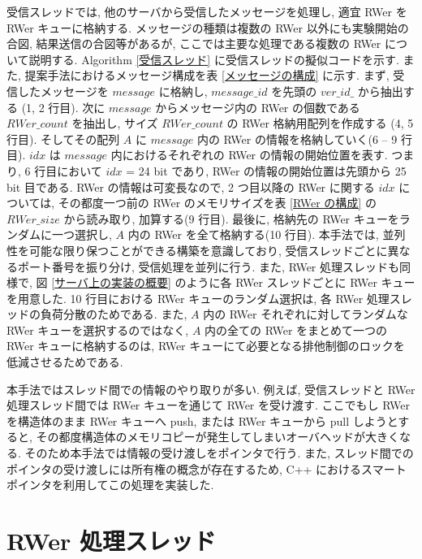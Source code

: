 受信スレッドでは, 他のサーバから受信したメッセージを処理し, 適宜 RWer を RWer キューに格納する. メッセージの種類は複数の RWer 以外にも実験開始の合図, 結果送信の合図等があるが, ここでは主要な処理である複数の RWer について説明する. Algorithm \ref{受信スレッド} に受信スレッドの擬似コードを示す. また, 提案手法におけるメッセージ構成を表 \ref{メッセージの構成} に示す. まず, 受信したメッセージを $message$ に格納し, $message\_id$ を先頭の $ver\_id\_$ から抽出する (1, 2 行目). 次に $message$ からメッセージ内の RWer の個数である $RWer\_count$ を抽出し, サイズ $RWer\_count$ の RWer 格納用配列を作成する (4, 5 行目). そしてその配列 $A$ に $message$ 内の RWer の情報を格納していく(6 -- 9 行目). $idx$ は $message$ 内におけるそれぞれの RWer の情報の開始位置を表す. つまり, 6 行目において $idx$ = 24 bit であり, RWer の情報の開始位置は先頭から 25 bit 目である. RWer の情報は可変長なので, 2 つ目以降の RWer に関する $idx$ については, その都度一つ前の RWer のメモリサイズを表 \ref{RWer の構成} の $RWer\_size$ から読み取り, 加算する(9 行目). 最後に, 格納先の RWer キューをランダムに一つ選択し, $A$ 内の RWer を全て格納する(10 行目). 本手法では, 並列性を可能な限り保つことができる構築を意識しており, 受信スレッドごとに異なるポート番号を振り分け, 受信処理を並列に行う. また, RWer 処理スレッドも同様で, 図 \ref{サーバ上の実装の概要} のように各 RWer スレッドごとに RWer キューを用意した. 10 行目における RWer キューのランダム選択は, 各 RWer 処理スレッドの負荷分散のためである. また, $A$ 内の RWer それぞれに対してランダムな RWer キューを選択するのではなく, $A$ 内の全ての RWer をまとめて一つの RWer キューに格納するのは, RWer キューにて必要となる排他制御のロックを低減させるためである. 

本手法ではスレッド間での情報のやり取りが多い. 例えば, 受信スレッドと RWer 処理スレッド間では RWer キューを通じて RWer を受け渡す. ここでもし RWer を構造体のまま RWer キューへ push, または RWer キューから pull しようとすると, その都度構造体のメモリコピーが発生してしまいオーバヘッドが大きくなる. そのため本手法では情報の受け渡しをポインタで行う. また, スレッド間でのポインタの受け渡しには所有権の概念が存在するため, C++ におけるスマートポインタを利用してこの処理を実装した. 



\section{RWer 処理スレッド}

